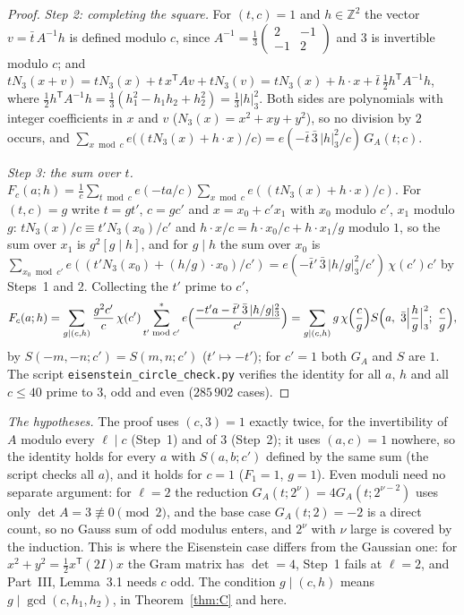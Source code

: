 \documentclass[11pt]{amsart}
\theoremstyle{remark}
\newcommand{\Z}{\mathbb{Z}}
\begin{document}
\begin{proof}
\emph{Step 2: completing the square.} For $(t,c)=1$ and $h\in\Z^2$ the vector $v=\bar t\,A^{-1}h$ is defined modulo $c$, since $A^{-1}=\frac13\left(\begin{smallmatrix}2&-1\\-1&2\end{smallmatrix}\right)$ and $3$ is invertible modulo $c$; and $tN_3(x+v)=tN_3(x)+t\,x^{\mathsf T}Av+tN_3(v)=tN_3(x)+h\cdot x+\bar t\,\tfrac12h^{\mathsf T}A^{-1}h$, where $\frac12h^{\mathsf T}A^{-1}h=\frac13(h_1^2-h_1h_2+h_2^2)=\frac13|h|_3^2$. Both sides are polynomials with integer coefficients in $x$ and $v$ ($N_3(x)=x^2+xy+y^2$), so no division by $2$ occurs, and $\sum_{x\bmod c}e\bigl((tN_3(x)+h\cdot x)/c\bigr)=e(-\bar t\,\bar3\,|h|_3^2/c)\,G_A(t;c)$.

\emph{Step 3: the sum over $t$.} $F_c(a;h)=\frac1c\sum_{t\bmod c}e(-ta/c)\sum_{x\bmod c}e((tN_3(x)+h\cdot x)/c)$. For $(t,c)=g$ write $t=gt'$, $c=gc'$ and $x=x_0+c'x_1$ with $x_0$ modulo $c'$, $x_1$ modulo $g$: $tN_3(x)/c\equiv t'N_3(x_0)/c'$ and $h\cdot x/c=h\cdot x_0/c+h\cdot x_1/g$ modulo $1$, so the sum over $x_1$ is $g^2[g\mid h]$, and for $g\mid h$ the sum over $x_0$ is $\sum_{x_0\bmod c'}e((t'N_3(x_0)+(h/g)\cdot x_0)/c')=e(-\bar t'\,\bar3\,|h/g|_3^2/c')\,\chi(c')c'$ by Steps~1 and 2. Collecting the $t'$ prime to $c'$,
\[
F_c(a;h)=\sum_{g\mid(c,h)}\frac{g^2c'}{c}\,\chi(c')\sum_{t'\bmod c'}^{*}e\Bigl(\frac{-t'a-\bar t'\,\bar3\,|h/g|_3^2}{c'}\Bigr)=\sum_{g\mid(c,h)}g\,\chi\Bigl(\frac cg\Bigr)S\Bigl(a,\ \bar3\Bigl|\frac hg\Bigr|_3^2;\ \frac cg\Bigr),
\]
by $S(-m,-n;c')=S(m,n;c')$ ($t'\mapsto-t'$); for $c'=1$ both $G_A$ and $S$ are $1$. The script \texttt{eisenstein\_circle\_check.py} verifies the identity for all $a$, $h$ and all $c\le40$ prime to $3$, odd and even ($285\,902$ cases).
\end{proof}

\emph{The hypotheses.} The proof uses $(c,3)=1$ exactly twice, for the invertibility of $A$ modulo every $\ell\mid c$ (Step~1) and of $3$ (Step~2); it uses $(a,c)=1$ nowhere, so the identity holds for every $a$ with $S(a,b;c')$ defined by the same sum (the script checks all $a$), and it holds for $c=1$ ($F_1=1$, $g=1$). Even moduli need no separate argument: for $\ell=2$ the reduction $G_A(t;2^\nu)=4G_A(t;2^{\nu-2})$ uses only $\det A=3\not\equiv0\pmod2$, and the base case $G_A(t;2)=-2$ is a direct count, so no Gauss sum of odd modulus enters, and $2^\nu$ with $\nu$ large is covered by the induction. This is where the Eisenstein case differs from the Gaussian one: for $x^2+y^2=\frac12x^{\mathsf T}(2I)x$ the Gram matrix has $\det=4$, Step~1 fails at $\ell=2$, and Part~III, Lemma~3.1 needs $c$ odd. The condition $g\mid(c,h)$ means $g\mid\gcd(c,h_1,h_2)$, in Theorem~\ref{thm:C} and here.
\end{document}
